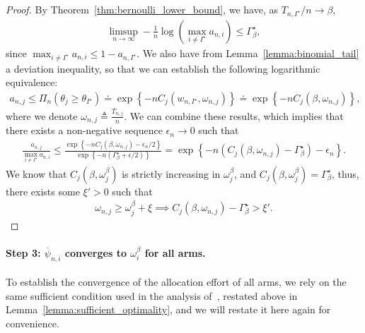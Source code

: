 \begin{proof}
By Theorem~\ref{thm:bernoulli_lower_bound}, we have, as $T_{n, I^\star} / n \rightarrow \beta$, 
\begin{align*}
\limsup_{n \rightarrow \infty} - \frac{1}{n} \log \left(\max_{i \neq I^\star} a_{n,i} \right) \leq \Gamma_{\beta}^\star,
\end{align*}
since $\max_{i \neq I^\star} a_{n,i} \leq 1 - a_{n,I^\star}$. We also have from Lemma~\ref{lemma:binomial_tail} a deviation inequality, so that we can establish the following logarithmic equivalence:
\begin{align*}
a_{n,j} \leq \Pi_{n}(\theta_j \geq \theta_{I^\star} ) \doteq \exp \left\lbrace - n C_{j} \left(w_{n, I^\star}, \omega_{n,j} \right) \right\rbrace \doteq \exp \left\lbrace - n C_{j} \left(\beta, \omega_{n,j} \right) \right\rbrace,
\end{align*}
where we denote $\omega_{n,j} \triangleq \frac{T_{n,j}}{n}$.
We can combine these results, which implies that there exists a non-negative sequence $\epsilon_n \rightarrow 0$ such that
\begin{align*}
\frac{a_{n,j}}{\max_{i \neq I^\star} a_{n,i}} \leq \frac{ \exp \left\lbrace -n C_{j} \left(\beta, \omega_{n,j} \right) - \epsilon_n / 2 \right\rbrace}{\exp \left \lbrace - n ( \Gamma_{\beta}^\star + \epsilon / 2 ) \right\rbrace} 
= \exp \left\lbrace -n \left( C_{j} \left(\beta, \omega_{n,j} \right) - \Gamma_{\beta}^\star \right) - \epsilon_n \right\rbrace.
\end{align*}
We know that $C_{j} \left(\beta, \omega_j^\beta \right)$ is strictly increasing in $\omega^\beta_j$, and $C_{j} \left(\beta, \omega_j^\beta \right) = \Gamma_{\beta}^\star$, thus, there exists some $\xi' > 0$ such that 
\begin{align*}
\omega_{n,j} \geq \omega_j^\beta + \xi \implies C_{j} \left(\beta, \omega_{n,j} \right) - \Gamma_{\beta}^\star > \xi'.
\end{align*}
\end{proof}

\paragraph{Step 3: $\overline{\psi}_{n,i}$ converges to $\omega_i^\beta$ for all arms.} To establish the convergence of the allocation effort of all arms, we rely on the same sufficient condition used in the analysis of~\cite{russo2016ttts}, restated above in Lemma~\ref{lemma:sufficient_optimality}, and we will restate it here again for convenience.
	
